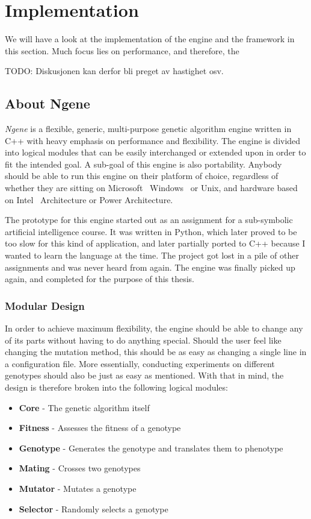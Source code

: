 \section{Implementation}
\label{sec:implementation}
We will have a look at the implementation of the engine and the framework in this section. Much focus lies on performance, and therefore, the

TODO: Diskusjonen kan derfor bli preget av hastighet osv.

\subsection{About Ngene}
\emph{Ngene} is a flexible, generic, multi-purpose genetic algorithm engine written in C++ with heavy emphasis on performance and flexibility. The engine is divided into logical modules that can be easily interchanged or extended upon in order to fit the intended goal. A sub-goal of this engine is also portability. Anybody should be able to run this engine on their platform of choice, regardless of whether they are sitting on Microsoft\textregistered~ Windows\texttrademark~ or Unix, and hardware based on Intel\textregistered~ Architecture or Power Architecture.

The prototype for this engine started out as an assignment for a sub-symbolic artificial intelligence course. It was written in Python, which later proved to be too slow for this kind of application, and later partially ported to C++ because I wanted to learn the language at the time. The project got lost in a pile of other assignments and was never heard from again. The engine was finally picked up again, and completed for the purpose of this thesis.

\subsubsection{Modular Design}
In order to achieve maximum flexibility, the engine should be able to change any of its parts without having to do anything special. Should the user feel like changing the mutation method, this should be as easy as changing a single line in a configuration file. More essentially, conducting experiments on different genotypes should also be just as easy as mentioned. With that in mind, the design is therefore broken into the following logical modules:

\begin{itemize}
	\itemsep=0pt
	\item\textbf{Core} - The genetic algorithm itself
	\item\textbf{Fitness} - Assesses the fitness of a genotype
	\item\textbf{Genotype} - Generates the genotype and translates them to phenotype
	\item\textbf{Mating} - Crosses two genotypes
	\item\textbf{Mutator} - Mutates a genotype
	\item\textbf{Selector} - Randomly selects a genotype
\end{itemize}

